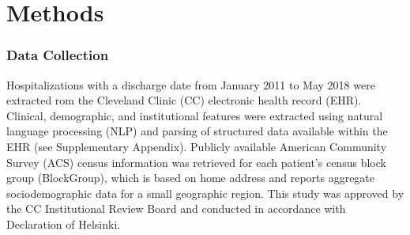 \section{Methods}
\subsubsection{Data Collection}
%
Hospitalizations with a discharge date from January 2011 to May 2018 were extracted 
rom the Cleveland Clinic (CC) electronic health record (EHR). 
Clinical, demographic, and institutional features were extracted 
using natural language processing (NLP) 
and parsing of structured data available within the EHR (see Supplementary Appendix). 
Publicly available American Community Survey (ACS) census information was retrieved 
for each patient’s census block group (BlockGroup), 
which is based on home address and reports aggregate sociodemographic data 
for a small geographic region.\supercite{acs}\@ 
This study was approved by the CC Institutional Review Board 
and conducted in accordance with Declaration of Helsinki.

